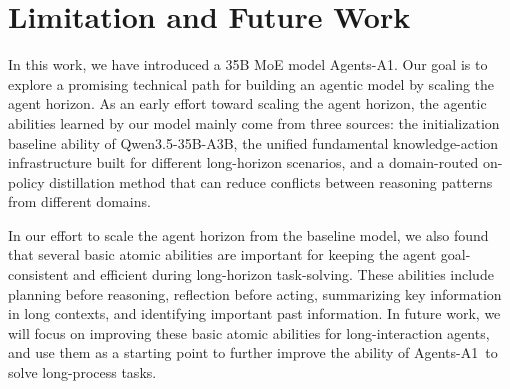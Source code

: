 \documentclass{llmxive}
\providecommand{\ProjectName}{Agents-A1}
\begin{document}
\section{Limitation and Future Work}
In this work, we have introduced a 35B MoE model \ProjectName. Our goal is to explore a promising technical path for building an agentic model by scaling the agent horizon. As an early effort toward scaling the agent horizon, the agentic abilities learned by our model mainly come from three sources: the initialization baseline ability of Qwen3.5-35B-A3B, the unified fundamental knowledge-action infrastructure built for different long-horizon scenarios, and a domain-routed on-policy distillation method that can reduce conflicts between reasoning patterns from different domains.

In our effort to scale the agent horizon from the baseline model, we also found that several basic atomic abilities are important for keeping the agent goal-consistent and efficient during long-horizon task-solving. These abilities include planning before reasoning, reflection before acting, summarizing key information in long contexts, and identifying important past information. In future work, we will focus on improving these basic atomic abilities for long-interaction agents, and use them as a starting point to further improve the ability of \ProjectName~to solve long-process tasks.
\end{document}
